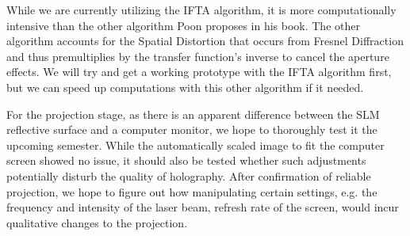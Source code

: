 \documentclass[12pt]{article}
\begin{document}
While we are currently utilizing the IFTA algorithm, it is more computationally intensive than the other algorithm Poon proposes in his book. The other algorithm accounts for the Spatial Distortion that occurs from Fresnel Diffraction and thus premultiplies by the transfer function's inverse to cancel the aperture effects. We will try and get a working prototype with the IFTA algorithm first, but we can speed up computations with this other algorithm if it needed.

For the projection stage, as there is an apparent difference between the SLM reflective surface and a computer monitor, we hope to thoroughly test it the upcoming semester. While the automatically scaled image to fit the computer screen showed no issue, it should also be tested whether such adjustments potentially disturb the quality of holography. After confirmation of reliable projection, we hope to figure out how manipulating certain settings, e.g. the frequency and intensity of the laser beam, refresh rate of the screen, would incur qualitative changes to the projection.



\end{document}
